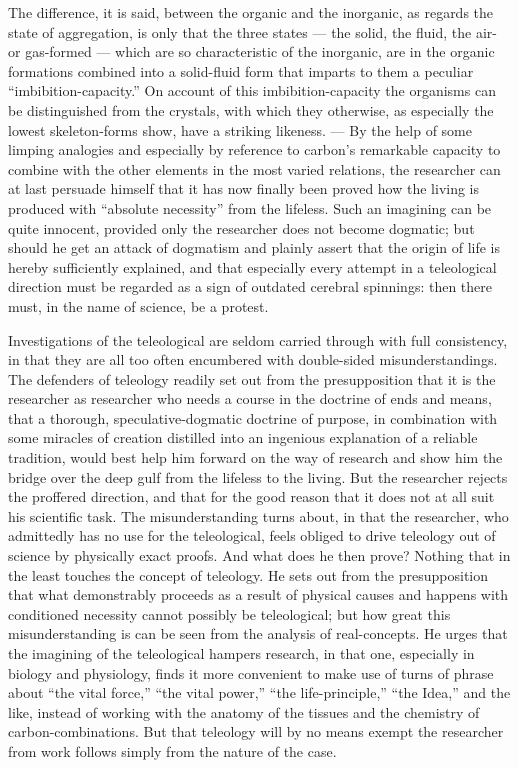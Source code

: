\documentclass[12pt]{book}
\begin{document}
The difference, it is said, between the organic and the inorganic, as regards the state
of aggregation, is only that the three states --- the solid, the fluid, the air- or
gas-formed --- which are so characteristic of the inorganic, are in the organic
formations combined into a solid-fluid form that imparts to them a peculiar
``imbibition-capacity.'' On account of this imbibition-capacity the organisms can be
distinguished from the crystals, with which they otherwise, as especially the lowest
skeleton-forms show, have a striking likeness. --- By the help of some limping analogies
and especially by reference to carbon's remarkable capacity to combine with the other
elements in the most varied relations, the researcher can at last persuade himself that it
has now finally been proved how the living is produced with ``absolute necessity'' from
the lifeless. Such an imagining can be quite innocent, provided only the researcher does
not become dogmatic; but should he get an attack of dogmatism and plainly assert that the
origin of life is hereby sufficiently explained, and that especially every attempt in a
teleological direction must be regarded as a sign of outdated cerebral spinnings: then
there must, in the name of science, be a protest.

Investigations of the teleological are seldom carried through with full consistency, in
that they are all too often encumbered with double-sided misunderstandings. The defenders
of teleology readily set out from the presupposition that it is the researcher as
researcher who needs a course in the doctrine of ends and means, that a thorough,
speculative-dogmatic doctrine of purpose, in combination with some miracles of creation
distilled into an ingenious explanation of a reliable tradition, would best help him
forward on the way of research and show him the bridge over the deep gulf from the
lifeless to the living. But the researcher rejects the proffered direction, and that for
the good reason that it does not at all suit his scientific task. The misunderstanding
turns about, in that the researcher, who admittedly has no use for the teleological, feels
obliged to drive teleology out of science by physically exact proofs. And what does he then
prove? Nothing that in the least touches the concept of teleology. He sets out from the
presupposition that what demonstrably proceeds as a result of physical causes and happens
with conditioned necessity cannot possibly be teleological; but how great this
misunderstanding is can be seen from the analysis of real-concepts. He urges that the
imagining of the teleological hampers research, in that one, especially in biology and
physiology, finds it more convenient to make use of turns of phrase about ``the vital
force,'' ``the vital power,'' ``the life-principle,'' ``the Idea,'' and the like, instead
of working with the anatomy of the tissues and the chemistry of carbon-combinations. But
that teleology will by no means exempt the researcher from work follows simply from the
nature of the case.
\end{document}

